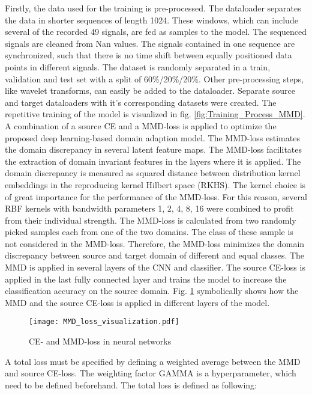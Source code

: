 Firstly, the data used for the training is pre-processed. The dataloader separates the data in shorter sequences of length 1024. These windows, which can include several of the recorded 49 signals, are fed as samples to the model. The sequenced signals are cleaned from Nan values. The signals contained in one sequence are synchronized, such that there is no time shift between equally positioned data points in different signals. The dataset is randomly separated in a train, validation and test set with a split of 60\%/20\%/20\%. Other pre-processing steps, like wavelet transforms, can easily be added to the dataloader. Separate source and target dataloaders with it's corresponding datasets were created. The repetitive training of the model is visualized in fig. \ref{fig:Training_Process_MMD}. A combination of a source CE and a MMD-loss is applied to optimize the proposed deep learning-based domain adaption model. The MMD-loss estimates the domain discrepancy in several latent feature maps. The MMD-loss facilitates the extraction of domain invariant features in the layers where it is applied. The domain discrepancy is measured as squared distance between distribution kernel embeddings in the reproducing kernel Hilbert space (RKHS). The kernel choice is of great importance for the performance of the MMD-loss. For this reason, several RBF kernels with bandwidth parameters 1, 2, 4, 8, 16 were combined to profit from their individual strength. The MMD-loss is calculated from two randomly picked samples each from one of the two domains. The class of these sample is not considered in the MMD-loss. Therefore, the MMD-loss minimizes the domain discrepancy between source and target domain of different and equal classes. The MMD is applied in several layers of the CNN and classifier. The source CE-loss is applied in the last fully connected layer and trains the model to increase the classification accuracy on the source domain. Fig. \ref{fig:MMD_Loss_and_CE_loss} symbolically shows how the MMD and the source CE-loss is applied in different layers of the model.



\begin{figure}[H]
  \centering
  \texttt{[image: MMD\_loss\_visualization.pdf]}
  \caption {CE- and MMD-loss in neural networks} \label{fig:MMD_Loss_and_CE_loss}
\end{figure}
 
A total loss must be specified by defining a weighted average between the MMD and source CE-loss. The weighting factor GAMMA is a hyperparameter, which need to be defined beforehand. The total loss is defined as following:

